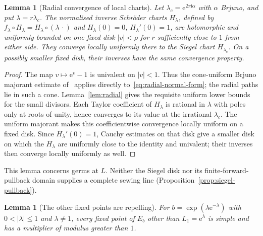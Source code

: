 \documentclass[11pt,a4paper]{article}
\newtheorem{lemma}[theorem]{Lemma}
\theoremstyle{definition}
\newcommand{\eee}{\mathrm{e}}
\newcommand{\ii}{\mathrm{i}}
\begin{document}
\begin{lemma}[Radial convergence of local charts]\label{lem:radial-chart}
Let $\lambda_c=\eee^{2\pi\ii\alpha}$ with $\alpha$ Brjuno, and put
$\lambda=r\lambda_c$.  The normalised inverse Schr\"oder charts
$H_\lambda$, defined by
$f_\lambda\circ H_\lambda=H_\lambda\circ(\lambda\,\cdot)$ and
$H_\lambda(0)=0$, $H_\lambda'(0)=1$, are holomorphic and uniformly
bounded on one fixed disk $|v|<\rho$ for $r$ sufficiently close to $1$
from either side.  They converge locally uniformly there to the Siegel
chart $H_{\lambda_c}$.  On a possibly smaller fixed disk, their inverses
have the same convergence property.
\end{lemma}

\begin{proof}
The map $v\mapsto\eee^v-1$ is univalent on $|v|<1$.  Thus the
cone-uniform Brjuno majorant estimate of~\cite{MarmiCarminati2008}
applies directly to~\eqref{eq:radial-normal-form}; the radial paths lie in
such a cone.  Lemma~\ref{lem:radial} gives the requisite uniform lower
bounds for the small divisors.  Each Taylor coefficient of $H_\lambda$ is
rational in $\lambda$ with poles only at roots of unity, hence converges to
its value at the irrational $\lambda_c$.  The uniform majorant makes this
coefficientwise convergence locally uniform on a fixed disk.  Since
$H_\lambda'(0)=1$, Cauchy estimates on that disk give a smaller disk on
which the $H_\lambda$ are uniformly close to the identity and univalent;
their inverses then converge locally uniformly as well.
\end{proof}

This lemma concerns germs at $L$.  Neither the Siegel disk nor its
finite-forward-pullback domain supplies a complete sewing line
(Proposition~\ref{prop:siegel-pullback}).

\begin{lemma}[The other fixed points are repelling]
\label{lem:boundary-repelling}
For $b=\exp(\lambda\eee^{-\lambda})$ with $0<|\lambda|\le1$ and
$\lambda\ne1$, every fixed point of $E_b$ other than $L_1=\eee^\lambda$
is simple and has a multiplier of modulus greater than $1$.
\end{lemma}
\end{document}
